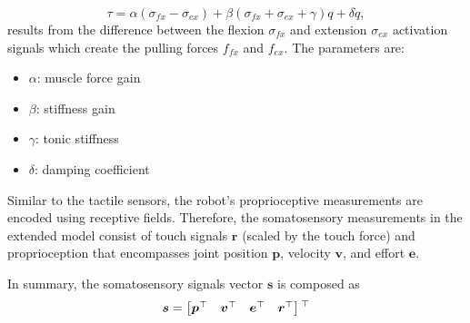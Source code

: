 \begin{equation}\label{eq:antagonistic_torque}
	\tau = \alpha \left(\sigma_{fx} - \sigma_{ex}\right)  + \beta \left(\sigma_{fx} + \sigma_{ex} + \gamma \right) q + \delta \dot{q},
\end{equation}
results from the difference between the flexion $ \sigma_{fx} $ and  extension $\sigma_{ex}$ activation signals which create the pulling forces $ f_{fx}$ and $f_{ex} $. The parameters are:
\begin{itemize}
	\item $\alpha$: muscle force gain
	\item $\beta$: stiffness gain
	\item $\gamma$: tonic stiffness	
	\item $\delta$: damping coefficient
\end{itemize}

Similar to the tactile sensors, the robot's proprioceptive measurements are encoded using receptive fields. Therefore, the somatosensory measurements in the extended model consist of touch signals $\bm{r}$ (scaled by the touch force) and proprioception that encompasses joint position $\bm{p}$, velocity $\bm{v}$, and effort $\bm{e}$.

In summary, the somatosensory signals vector $\bm{s}$ is composed as 
\begin{equation}
	\bm{s} = \begin{bmatrix}
		\bm{p}{^{\top}} & \bm{v}{^{\top}} & \bm{e}{^{\top}} & \bm{r}{^{\top}}
	\end{bmatrix}{^{\top}}
\end{equation}

